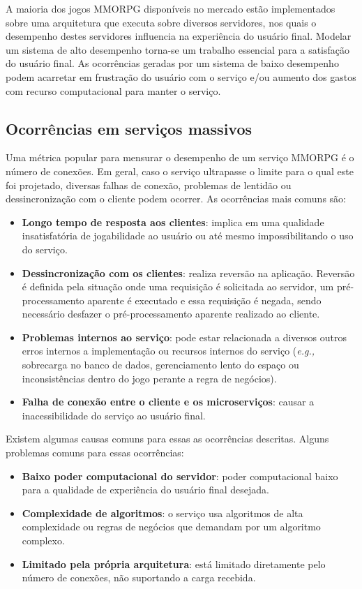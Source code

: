 A maioria dos jogos \ac{MMORPG} disponíveis no mercado estão implementados sobre uma arquitetura que executa sobre diversos servidores, nos quais o desempenho destes servidores influencia na experiência do usuário final.
%
Modelar um sistema de alto desempenho torna-se um trabalho essencial para a satisfação do usuário final\cite{1417630}.
%
As ocorrências geradas por um sistema de baixo desempenho podem acarretar em frustração do usuário com o serviço e/ou aumento dos gastos com recurso computacional para manter o serviço.


\subsection{Ocorrências em serviços massivos}
\label{sec:ocorrencias}

Uma métrica popular para mensurar o desempenho de um serviço \ac{MMORPG} é o número de conexões\cite{1417630}.
%
Em geral, caso o serviço ultrapasse o limite para o qual este foi projetado, diversas falhas de conexão, problemas de lentidão ou dessincronização com o cliente podem ocorrer.
%
As ocorrências mais comuns são\cite{1417630}:

\begin{itemize}
  \item \textbf{Longo tempo de resposta aos clientes}: implica em uma qualidade insatisfatória de jogabilidade ao usuário ou até mesmo impossibilitando o uso do serviço.
  \item \textbf{Dessincronização com os clientes}: realiza reversão na aplicação. Reversão é definida pela situação onde uma requisição é solicitada ao servidor, um pré-processamento aparente é executado e essa requisição é negada, sendo necessário desfazer o pré-processamento aparente realizado ao cliente.
  \item \textbf{Problemas internos ao serviço}:  pode estar relacionada a diversos outros erros internos a implementação ou recursos internos do serviço (\textit{e.g.,} sobrecarga no banco de dados, gerenciamento lento do espaço ou inconsistências dentro do jogo perante a regra de negócios).
  \item \textbf{Falha de conexão entre o cliente e os microserviços}: causar a inacessibilidade do serviço ao usuário final.
\end{itemize}

Existem algumas causas comuns para essas as ocorrências descritas. Alguns problemas comuns para essas ocorrências\cite{1417630}:

\begin{itemize}
  \item \textbf{Baixo poder computacional do servidor}: poder computacional baixo para a qualidade de experiência do usuário final desejada.
  \item \textbf{Complexidade de algoritmos}: o serviço usa algoritmos de alta complexidade ou regras de negócios que demandam por um algoritmo complexo.
  \item \textbf{Limitado pela própria arquitetura}: está limitado diretamente pelo número de conexões, não suportando a carga recebida.
\end{itemize}

